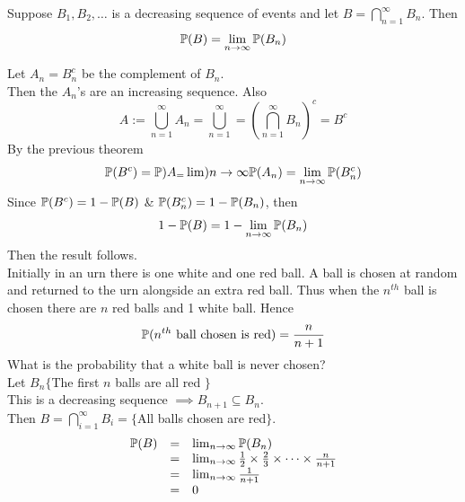 \documentclass[11pt,a4paper]{article}
\begin{document}
Suppose $B_1,B_2,\dots$ is a decreasing sequence of events and let $B=\bigcap\limits_{n=1}^\infty B_n$. Then
$$\mathbb{P}(B)=\lim_{n\to\infty}\mathbb{P}(B_n)$$

Let $A_n=B_n^c$ be the complement of $B_n$.\\
Then the $A_n$'s are an increasing sequence. Also
$$A:=\bigcup\limits_{n=1}^\infty A_n=\bigcup\limits_{n=1}^\infty=\left(\bigcap\limits_{n=1}^\infty B_n\right)^c=B^c$$
By the previous theorem
$$\mathbb{P}(B^c)=\mathbb{P})A_=\lim){n\to\infty}\mathbb{P}(A_n)=\lim_{n\to\infty}\mathbb{P}(B_n^c)$$
Since $\mathbb{P}(B^c)=1-\mathbb{P}(B)$ \& $\mathbb{P}(B_n^c)=1-\mathbb{P}(B_n)$, then
$$1-\mathbb{P}(B)=1-\lim_{n\to\infty}\mathbb{P}(B_n)$$
Then the result follows.\\

Initially in an urn there is one white and one red ball. A ball is chosen at random and returned to the urn alongside an extra red ball. Thus when the $n^{th}$ ball is chosen there are $n$ red balls and 1 white ball. Hence
$$\prob(n^{th}\mathrm{\ ball\ chosen\ is\ red})=\frac{n}{n+1}$$
What is the probability that a white ball is never chosen?\\
Let $B_n\{$The first $n$ balls are all red $\}$\\
This is a decreasing sequence $\implies B_{n+1}\subseteq B_n$.\\
Then $B=\bigcap\limits_{i=1}^\infty B_i=\{$All balls chosen are red$\}$.\\
\[\begin{array}{rcl}
\mathbb{P}(B)&=&\lim_{n\to\infty}\mathbb{P}(B_n)\\
&=&\lim_{n\to\infty}\frac{1}{2}\times\frac{2}{3}\times\dots\times\frac{n}{n+1}\\
&=&\lim_{n\to\infty}\frac{1}{n+1}\\
&=&0
\end{array}\]
\end{document}

